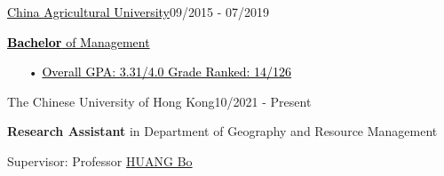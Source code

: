 \documentclass{joel_cv}
\begin{document}
\begin{sectionContentSimple}{\href{http://www.cau.edu.cn/}{\textcolor{black}{China Agricultural University}}}{09/2015 - 07/2019}
	\item \href{https://zhu-sk.github.io/Certificates_EN_2Pages.pdf}{\textcolor{black}{\textbf{Bachelor} of Management}}
	\begin{itemize}
	\item[•] \href{https://zhu-sk.github.io/Transcript_EN_2Pages.pdf}{\textcolor{black}{Overall GPA: 3.31/4.0 \quad Grade Ranked: 14/126}}%
	\end{itemize}
\end{sectionContentSimple}
\begin{sectionContentSimple}{The Chinese University of Hong Kong}{10/2021 - Present}
	\item \textbf{Research Assistant} in Department of Geography and Resource Management
	\item Supervisor: Professor \href{https://www.grm.cuhk.edu.hk/en/profile/bhuang/}{HUANG Bo}
\end{sectionContentSimple}
\end{document}
